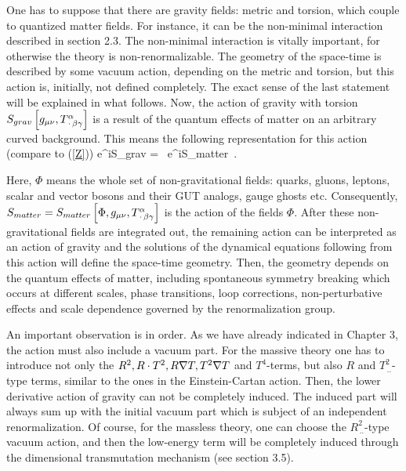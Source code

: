 One has to suppose that there are gravity fields: metric and 
torsion, which couple to quantized matter fields. 
For instance, it can be the non-minimal interaction described
in section 2.3. The non-minimal interaction is vitally important, 
for otherwise the theory is non-renormalizable. The geometry of 
the space-time is described by some vacuum action, depending 
on the metric and torsion, but this action is, initially, not 
defined completely. The exact sense of the last statement will 
be explained in what follows. Now, the action of gravity with 
torsion $S_{grav}\left[g_{\mu\nu},T^\alpha_{\,\cdot\,\beta\gamma}\right]$ 
is a result of the quantum effects of matter
on an arbitrary curved background. This means the following 
representation for this action (compare to (\ref{Z}))
\beq
e^{iS_{grav}}
= \Phi\,
e^{iS_{matter}
}\,.
\label{indu1}
\eeq

Here, $\Phi$ means the whole set of non-gravitational fields: 
quarks, gluons, leptons, scalar and vector 
bosons and their GUT analogs, gauge ghosts etc. Consequently, 
$S_{matter} = S_{matter}
\left[\Phi,g_{\mu\nu},T^\alpha_{\,\cdot\,\beta\gamma}\right]$
is the action of the fields $\Phi$. 
After these non-gravitational fields are integrated out, the 
remaining action can be interpreted as an action of gravity 
and the solutions of the dynamical equations following from
this action will define the space-time geometry. Then, the 
geometry depends on the quantum effects of matter, including 
spontaneous symmetry breaking which occurs at different scales,
phase transitions, loop corrections, non-perturbative effects
and scale dependence governed by the renormalization group. 

An important observation is in order. As we have already 
indicated in Chapter 3, the action must also 
include a vacuum part. For the massive theory one
has to introduce not only the $R^2, R\cdot T^2, R\nabla T,
T^2\nabla T$ and $T^4$-terms, but also $R$ and 
$T^2_{\,..}$-type terms, similar to the
ones in the Einstein-Cartan action. Then, the lower derivative
action of gravity can not be completely induced. The induced 
part will always sum up with the initial vacuum part which 
is subject of an independent renormalization.   
Of course, for the massless theory, one can choose the
$R^2_{\,..}$-type vacuum action, and then the low-energy
term will be completely induced through the dimensional 
transmutation mechanism (see section 3.5).

